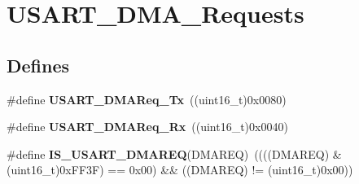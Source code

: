 \hypertarget{group__USART__DMA__Requests}{
\section{USART\_\-DMA\_\-Requests}
\label{group__USART__DMA__Requests}
}
\subsection*{Defines}
\begin{DoxyCompactItemize}
\item 
\hypertarget{group__USART__DMA__Requests_gae38097d8f82ba969c9812194022cae9a}{
\#define {\bfseries USART\_\-DMAReq\_\-Tx}~((uint16\_\-t)0x0080)}
\label{group__USART__DMA__Requests_gae38097d8f82ba969c9812194022cae9a}

\item 
\hypertarget{group__USART__DMA__Requests_gaf33c13abb942251afab3297d8b8362ca}{
\#define {\bfseries USART\_\-DMAReq\_\-Rx}~((uint16\_\-t)0x0040)}
\label{group__USART__DMA__Requests_gaf33c13abb942251afab3297d8b8362ca}

\item 
\hypertarget{group__USART__DMA__Requests_ga8be7a899d21d82de2ee0a763b4564dc3}{
\#define {\bfseries IS\_\-USART\_\-DMAREQ}(DMAREQ)~((((DMAREQ) \& (uint16\_\-t)0xFF3F) == 0x00) \&\& ((DMAREQ) != (uint16\_\-t)0x00))}
\label{group__USART__DMA__Requests_ga8be7a899d21d82de2ee0a763b4564dc3}

\end{DoxyCompactItemize}
